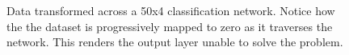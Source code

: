 \begin{figure}[h!]
{{    %
    }
    \parbox{.195\textwidth}{%
    }
  }
  \caption{Data transformed across a 50x4 \ReLU classification network. Notice how the the dataset is progressively mapped to zero as it traverses the network. This renders the output layer unable to solve the problem.}
    \label{fig:moonsReLU}
\end{figure}

